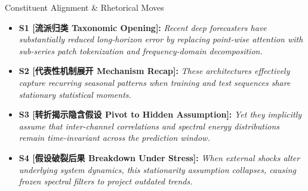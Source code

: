 \begin{TipBox}{Constituent Alignment \& Rhetorical Moves}
\begin{itemize}[leftmargin=1.5em]
  \item \textbf{S1 [流派归类 Taxonomic Opening]:} \textit{Recent deep forecasters have substantially reduced long-horizon error by replacing point-wise attention with sub-series patch tokenization and frequency-domain decomposition.}\par{}
  \item \textbf{S2 [代表性机制展开 Mechanism Recap]:} \textit{These architectures effectively capture recurring seasonal patterns when training and test sequences share stationary statistical moments.}\par{}
  \item \textbf{S3 [转折揭示隐含假设 Pivot to Hidden Assumption]:} \textit{Yet they implicitly assume that inter-channel correlations and spectral energy distributions remain time-invariant across the prediction window.}\par{}
  \item \textbf{S4 [假设破裂后果 Breakdown Under Stress]:} \textit{When external shocks alter underlying system dynamics, this stationarity assumption collapses, causing frozen spectral filters to project outdated trends.}\par{}
\end{itemize}
\end{TipBox}
\bigskip
